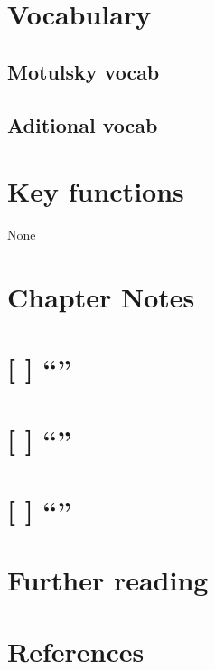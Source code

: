 \documentclass[]{book}
\theoremstyle{definition}
\theoremstyle{definition}
\theoremstyle{definition}
\theoremstyle{remark}
\begin{document}
\section*{Vocabulary}\label{vocabulary-16}

\subsection*{Motulsky vocab}\label{motulsky-vocab-16}

\subsection*{Aditional vocab}\label{aditional-vocab-13}

\section*{Key functions}\label{key-functions-15}

None

\section*{Chapter Notes}\label{chapter-notes-16}

\section{\texorpdfstring{{[} {]} ``''}{{[} {]} }}\label{section-27}

\section{\texorpdfstring{{[} {]} ``''}{{[} {]} }}\label{section-28}

\section{\texorpdfstring{{[} {]} ``''}{{[} {]} }}\label{section-29}

\section*{Further reading}\label{further-reading-15}

\section*{References}\label{references-15}


\end{document}
